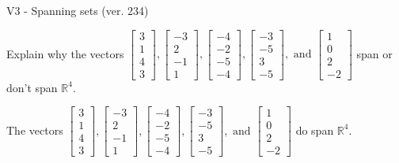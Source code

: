 \begin{exercise}
  \begin{exerciseTitle}V3 - Spanning sets (ver. 234)\end{exerciseTitle}
  \begin{exerciseStatement}
    Explain why the vectors \(\left[\begin{array}{r}
3 \\
1 \\
4 \\
3
\end{array}\right] , \left[\begin{array}{r}
-3 \\
2 \\
-1 \\
1
\end{array}\right] , \left[\begin{array}{r}
-4 \\
-2 \\
-5 \\
-4
\end{array}\right] , \left[\begin{array}{r}
-3 \\
-5 \\
3 \\
-5
\end{array}\right] , \text{ and } \left[\begin{array}{r}
1 \\
0 \\
2 \\
-2
\end{array}\right]\) span or don't span \(\mathbb{R}^4\). 
	


  \end{exerciseStatement}
  \begin{exerciseAnswer}
   The vectors \(\left[\begin{array}{r}
3 \\
1 \\
4 \\
3
\end{array}\right] , \left[\begin{array}{r}
-3 \\
2 \\
-1 \\
1
\end{array}\right] , \left[\begin{array}{r}
-4 \\
-2 \\
-5 \\
-4
\end{array}\right] , \left[\begin{array}{r}
-3 \\
-5 \\
3 \\
-5
\end{array}\right] , \text{ and } \left[\begin{array}{r}
1 \\
0 \\
2 \\
-2
\end{array}\right]\) 
  	 do  
	span \(\mathbb{R}^4\).
  



\end{exerciseAnswer}
\end{exercise}
